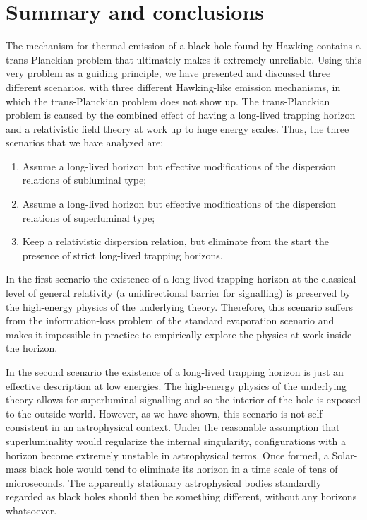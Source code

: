 \documentclass[12pt]{article}
\begin{document}
\section{Summary and conclusions}
\label{Sec:Summary}

The mechanism for thermal emission of a black hole found by Hawking  
contains a trans-Planckian problem that ultimately makes it extremely unreliable.
Using this very problem as a guiding principle, we have  presented 
and discussed three different scenarios, with three different Hawking-like 
emission mechanisms, in which the trans-Planckian problem does not show up.
The trans-Planckian problem is caused by the combined effect of having
a long-lived trapping horizon and a relativistic field theory at work up 
to huge energy scales. Thus, the three scenarios that we have analyzed are:
\begin{enumerate}
\item
Assume a long-lived horizon but effective modifications of the dispersion
relations of subluminal type;
\item
Assume a long-lived horizon but effective modifications of the dispersion
relations of superluminal type;
\item
Keep a relativistic dispersion relation, but eliminate from the start the 
presence of strict long-lived trapping horizons.
\end{enumerate}

In the first scenario the existence of a long-lived trapping horizon 
at the classical level of general relativity (a unidirectional barrier for 
signalling) is preserved by the high-energy physics of the underlying theory.  
Therefore, this scenario suffers from the information-loss problem of the 
standard evaporation scenario and makes it impossible in practice to empirically
explore the physics at work inside the horizon. 

In the second scenario the existence of a long-lived trapping horizon 
is just an effective description at low energies. The high-energy physics of 
the underlying theory allows for superluminal signalling and so the interior of the
hole is exposed to the outside world. However, as we have shown, this scenario
is not self-consistent in an astrophysical context. Under the reasonable assumption that superluminality would regularize the internal
singularity, configurations with a horizon become extremely unstable in astrophysical terms. Once formed, a Solar-mass black hole would tend 
to eliminate its horizon in a time scale of tens of microseconds. The apparently 
stationary astrophysical bodies standardly regarded as black holes should then be 
something different, without any horizons whatsoever. 
\end{document}
